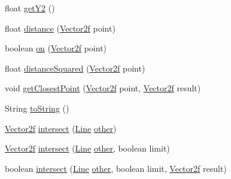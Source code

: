 \begin{DoxyCompactItemize}
\item 
float \mbox{\hyperlink{classorg_1_1newdawn_1_1slick_1_1geom_1_1_line_a70e1c978a726e6bc1bc9742592eeba37}{get\+Y2}} ()
\item 
float \mbox{\hyperlink{classorg_1_1newdawn_1_1slick_1_1geom_1_1_line_a43d8070c66d7d1df7a89cc740b001bd6}{distance}} (\mbox{\hyperlink{classorg_1_1newdawn_1_1slick_1_1geom_1_1_vector2f}{Vector2f}} point)
\item 
boolean \mbox{\hyperlink{classorg_1_1newdawn_1_1slick_1_1geom_1_1_line_a7befe965e7a9b1da6015609b2ae3b20a}{on}} (\mbox{\hyperlink{classorg_1_1newdawn_1_1slick_1_1geom_1_1_vector2f}{Vector2f}} point)
\item 
float \mbox{\hyperlink{classorg_1_1newdawn_1_1slick_1_1geom_1_1_line_a6d4d9753ee77f6303997690e0bbd115f}{distance\+Squared}} (\mbox{\hyperlink{classorg_1_1newdawn_1_1slick_1_1geom_1_1_vector2f}{Vector2f}} point)
\item 
void \mbox{\hyperlink{classorg_1_1newdawn_1_1slick_1_1geom_1_1_line_ae555b65b604e0bed3e650ab156375a99}{get\+Closest\+Point}} (\mbox{\hyperlink{classorg_1_1newdawn_1_1slick_1_1geom_1_1_vector2f}{Vector2f}} point, \mbox{\hyperlink{classorg_1_1newdawn_1_1slick_1_1geom_1_1_vector2f}{Vector2f}} result)
\item 
String \mbox{\hyperlink{classorg_1_1newdawn_1_1slick_1_1geom_1_1_line_ac9881633ff0a840e7387793c38b2893c}{to\+String}} ()
\item 
\mbox{\hyperlink{classorg_1_1newdawn_1_1slick_1_1geom_1_1_vector2f}{Vector2f}} \mbox{\hyperlink{classorg_1_1newdawn_1_1slick_1_1geom_1_1_line_a9b75c7b1fea8dc4f0e2382205597335c}{intersect}} (\mbox{\hyperlink{classorg_1_1newdawn_1_1slick_1_1geom_1_1_line}{Line}} \mbox{\hyperlink{classorg_1_1newdawn_1_1slick_1_1geom_1_1_line_a9e03a0c3036406f4c22a6486a23d0b4f}{other}})
\item 
\mbox{\hyperlink{classorg_1_1newdawn_1_1slick_1_1geom_1_1_vector2f}{Vector2f}} \mbox{\hyperlink{classorg_1_1newdawn_1_1slick_1_1geom_1_1_line_a1dad101432f78c584c503d2e0a78bb99}{intersect}} (\mbox{\hyperlink{classorg_1_1newdawn_1_1slick_1_1geom_1_1_line}{Line}} \mbox{\hyperlink{classorg_1_1newdawn_1_1slick_1_1geom_1_1_line_a9e03a0c3036406f4c22a6486a23d0b4f}{other}}, boolean limit)
\item 
boolean \mbox{\hyperlink{classorg_1_1newdawn_1_1slick_1_1geom_1_1_line_ad62955f4442e1965fa0f88b08246d27d}{intersect}} (\mbox{\hyperlink{classorg_1_1newdawn_1_1slick_1_1geom_1_1_line}{Line}} \mbox{\hyperlink{classorg_1_1newdawn_1_1slick_1_1geom_1_1_line_a9e03a0c3036406f4c22a6486a23d0b4f}{other}}, boolean limit, \mbox{\hyperlink{classorg_1_1newdawn_1_1slick_1_1geom_1_1_vector2f}{Vector2f}} result)

\end{DoxyCompactItemize}
